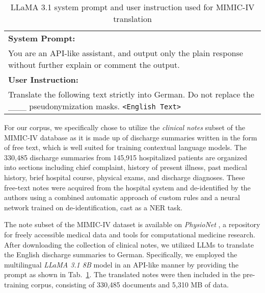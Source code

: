 \begin{table}[htb]
    \centering
    \begin{tabular}{p{}}
        \toprule
        \textbf{System Prompt:} \\
        You are an API-like assistant, and output only the plain response
        without further explain or comment the output. \\
        \midrule
        \textbf{User Instruction:} \\
        Translate the following text strictly into German. Do not replace the
        \_\_\_ pseudonymization masks. \texttt{<English Text>} \\
        \bottomrule
    \end{tabular}
    \caption{LLaMA 3.1 system prompt and user instruction used for MIMIC-IV
    translation}
    \label{tab:llama}
\end{table}

For our corpus, we specifically chose to utilize the \textit{clinical notes}
\cite{johnson2023mimicnote} subset of the MIMIC-IV database as it is made up of
discharge summaries written in the form of free text, which is well suited for
training contextual language models. The 330,485 discharge summaries from
145,915 hospitalized patients are organized into sections including chief
complaint, history of present illness, past medical history, brief hospital
course, physical exams, and discharge diagnoses. These free-text notes were
acquired from the hospital system and de-identified by the authors using a
combined automatic approach of custom rules and a neural network trained on
de-identification, cast as a NER task. 

The note subset of the MIMIC-IV dataset is available on \textit{PhysioNet}
\cite{goldberger2000physiobank}, a repository for freely accessible medical data
and tools for computational medicine research. After downloading the collection
of clinical notes, we utilized LLMs to translate the English discharge summaries
to German. Specifically, we employed the multilingual \textit{LLaMA 3.1 8B}
\cite{dubey2024llama3} model in an API-like manner by providing the prompt as
shown in Tab.~\ref{tab:llama}. The translated notes were then included in the
pre-training corpus, consisting of 330,485 documents and 5,310 MB of data.


